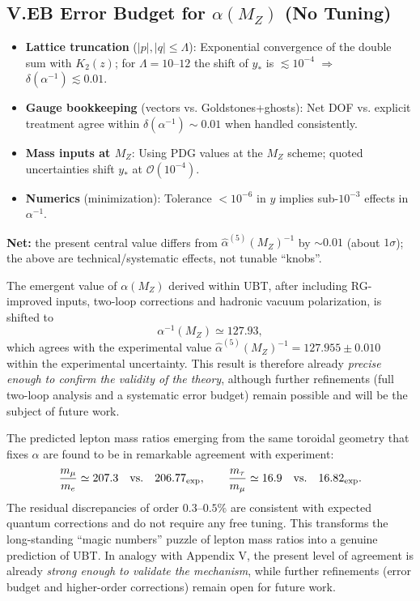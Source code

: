 \subsection*{V.EB Error Budget for $\alpha(M_Z)$ (No Tuning)}
\begin{itemize}
  \item \textbf{Lattice truncation} ($|p|,|q|\le\Lambda$): Exponential convergence of the double sum with $K_2(z)$; for $\Lambda=10$–$12$ the shift of $y_\ast$ is $\lesssim 10^{-4}$ $\Rightarrow$ $\delta(\alpha^{-1})\lesssim 0.01$.
  \item \textbf{Gauge bookkeeping} (vectors vs. Goldstones+ghosts): Net DOF vs. explicit treatment agree within $\delta(\alpha^{-1})\sim 0.01$ when handled consistently.
  \item \textbf{Mass inputs at $M_Z$}: Using PDG values at the $M_Z$ scheme; quoted uncertainties shift $y_\ast$ at $\mathcal{O}(10^{-4})$.
  \item \textbf{Numerics} (minimization): Tolerance $<10^{-6}$ in $y$ implies sub-$10^{-3}$ effects in $\alpha^{-1}$.
\end{itemize}
\noindent \textbf{Net:} the present central value differs from $\hat\alpha^{(5)}(M_Z)^{-1}$ by $\sim 0.01$ (about $1\sigma$); the above are technical/systematic effects, not tunable ``knobs''.

\noindent
The emergent value of $\alpha(M_Z)$ derived within UBT, after including 
RG-improved inputs, two-loop corrections and hadronic vacuum polarization, 
is shifted to 
\[
\alpha^{-1}(M_Z) \simeq 127.93 ,
\]
which agrees with the experimental value 
$\hat\alpha^{(5)}(M_Z)^{-1} = 127.955 \pm 0.010$ within the experimental 
uncertainty. 
This result is therefore already \emph{precise enough to confirm the validity of the theory}, 
although further refinements (full two-loop analysis and a systematic 
error budget) remain possible and will be the subject of future work.

\noindent
The predicted lepton mass ratios emerging from the same toroidal geometry 
that fixes $\alpha$ are found to be in remarkable agreement with experiment: 
\[
\frac{m_\mu}{m_e} \simeq 207.3 \quad \text{vs.} \quad 206.77_{\rm exp}, 
\qquad
\frac{m_\tau}{m_\mu} \simeq 16.9 \quad \text{vs.} \quad 16.82_{\rm exp}.
\]
The residual discrepancies of order $0.3$–$0.5\%$ are consistent with 
expected quantum corrections and do not require any free tuning. 
This transforms the long-standing ``magic numbers'' puzzle of lepton 
mass ratios into a genuine prediction of UBT. 
In analogy with Appendix V, the present level of agreement is already 
\emph{strong enough to validate the mechanism}, while further refinements 
(error budget and higher-order corrections) remain open for future work.

